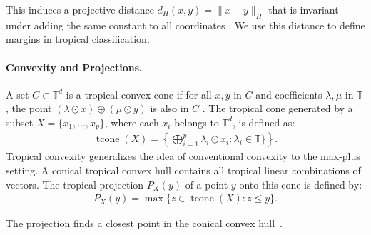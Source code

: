 \documentclass{article}
\newcommand{\tcone}{\operatorname{tcone}}
\renewcommand{\leq}{\leqslant}
\newcommand{\trop}{\mathbb{T}}
\begin{document}
This induces a projective distance $d_H(x,y) = \|x - y\|_H$ that is invariant under adding the same constant to all coordinates \cite{cohen2004}. We use this distance to define margins in tropical classification.

\paragraph{Convexity and Projections.}
A set $C \subset \trop^d$ is a tropical convex cone if for all $x,y$ in $C$ and coefficients $\lambda,\mu$ in $\trop$,
the point $(\lambda \odot x) \oplus (\mu \odot y)$ is also in $C$ \cite{cohen2004,develin2004}.
The tropical cone generated by a subset $X=\{x_1,\ldots,x_p\}$, where
each $x_i$ belongs to $\trop^d$, is defined as:
\begin{align}
  \tcone(X) = \left\{\bigoplus_{i=1}^p \lambda_i \odot x_i : \lambda_i \in \trop\} \right\}.\label{e-def-tcone}
\end{align}
Tropical convexity generalizes the idea of conventional convexity to the max-plus setting. A conical tropical convex hull contains all tropical linear combinations of vectors. 
The tropical projection $P_X(y)$ of a point $y$ onto this cone is
defined by:
\begin{align}
P_X(y) = \max\{z \in \tcone(X) : z \leq y\}\label{e-canonical}.
\end{align}

The projection finds a closest point in the conical convex hull~\cite{cohen2004,AGNS10}.
\end{document}
